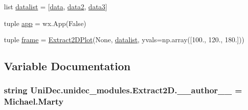 \begin{DoxyCompactItemize}
\item 
list \hyperlink{namespace_uni_dec_1_1unidec__modules_1_1_extract2_d_afd604f25bfa553644a3b6016f99b0afa}{datalist} = \mbox{[}\hyperlink{namespace_uni_dec_1_1unidec__modules_1_1_extract2_d_a631595b08dc933d757bb574ffb81c40b}{data}, \hyperlink{namespace_uni_dec_1_1unidec__modules_1_1_extract2_d_a784c0733bdfc7664522f4424544dd1cc}{data2}, \hyperlink{namespace_uni_dec_1_1unidec__modules_1_1_extract2_d_a38e0fa19d93aef729352bba636150691}{data3}\mbox{]}
\item 
tuple \hyperlink{namespace_uni_dec_1_1unidec__modules_1_1_extract2_d_ae557cbf7acc5ff9d6e476464517ce2a8}{app} = wx.\+App(False)
\item 
tuple \hyperlink{namespace_uni_dec_1_1unidec__modules_1_1_extract2_d_a82d38bf33b7bc117d5dfb661a8513458}{frame} = \hyperlink{class_uni_dec_1_1unidec__modules_1_1_extract2_d_1_1_extract2_d_plot}{Extract2\+D\+Plot}(None, \hyperlink{namespace_uni_dec_1_1unidec__modules_1_1_extract2_d_afd604f25bfa553644a3b6016f99b0afa}{datalist}, yvals=np.\+array(\mbox{[}100., 120., 180.\mbox{]}))
\end{DoxyCompactItemize}


\subsection{Variable Documentation}
\hypertarget{namespace_uni_dec_1_1unidec__modules_1_1_extract2_d_a80dd2d3d98987c97d9dd4790a9b5030a}{}
\subsubsection[{\+\_\+\+\_\+author\+\_\+\+\_\+}]{\setlength{\rightskip}{0pt plus 5cm}string Uni\+Dec.\+unidec\+\_\+modules.\+Extract2\+D.\+\_\+\+\_\+author\+\_\+\+\_\+ = \textquotesingle{}Michael.\+Marty\textquotesingle{}}\label{namespace_uni_dec_1_1unidec__modules_1_1_extract2_d_a80dd2d3d98987c97d9dd4790a9b5030a}
\hypertarget{namespace_uni_dec_1_1unidec__modules_1_1_extract2_d_ae557cbf7acc5ff9d6e476464517ce2a8}{}
